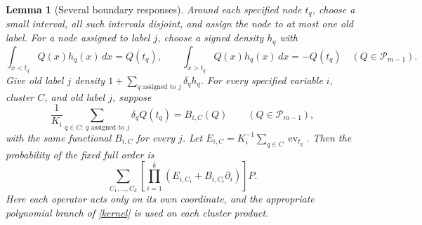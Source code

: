 \documentclass[11pt]{article}
\newtheorem{lemma}{Lemma}
\newcommand{\PP}{\mathcal P}
\begin{document}
\begin{lemma}[Several boundary responses]\label{response}
Around each specified node $t_q$, choose a small interval, all such
intervals disjoint, and assign the node to at most one old label.
For a node assigned to label $j$, choose a signed density $h_q$ with
\[
 \int_{x<t_q}Q(x)h_q(x)\,dx=Q(t_q),\qquad
 \int_{x>t_q}Q(x)h_q(x)\,dx=-Q(t_q)
 \quad(Q\in\PP_{m-1}).
\]
Give old label $j$ density $1+\sum_{q\text{ assigned to }j}\delta_qh_q$.
For every specified variable $i$, cluster $C$, and old label $j$, suppose
\begin{equation}\label{common}
 \frac1{K_i}\sum_{q\in C:\ q\text{ assigned to }j}
                   \delta_q Q(t_q)=B_{i,C}(Q)
                 \qquad(Q\in\PP_{m-1}),
\end{equation}
with the same functional $B_{i,C}$ for every $j$.
Let $E_{i,C}=K_i^{-1}\sum_{q\in C}\operatorname{ev}_{t_q}$.
Then the probability of the fixed full order is
\begin{equation}\label{operator}
 \sum_{C_1,\ldots,C_k}
 \left[\prod_{i=1}^k(E_{i,C_i}+B_{i,C_i}\partial_i)\right]P.
\end{equation}
Here each operator acts only on its own coordinate, and the appropriate
polynomial branch of \eqref{kernel} is used on each cluster product.
\end{lemma}
\end{document}
